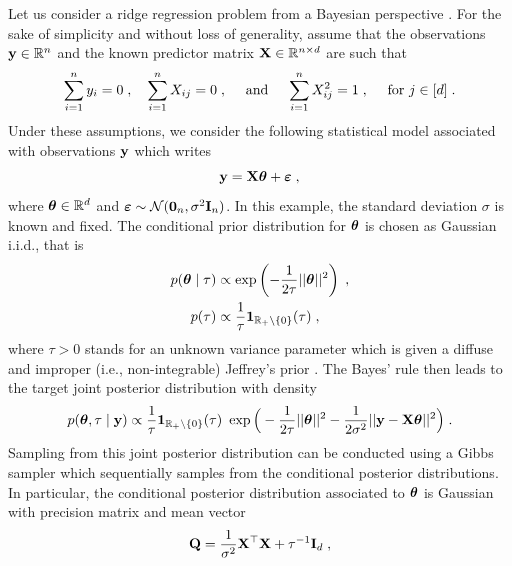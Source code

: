 \documentclass[nohypdvips,onefignum,onetabnum]{siamart171218}
\begin{document}
\begin{example}\label{ex:bayesian_ridge}
  Let us consider a ridge regression problem from a Bayesian perspective \cite{Bishop2006}.
  For the sake of simplicity and without loss of generality, assume that the observations $\mathbf{y} \in \mathbb{R}^n$ and the known predictor matrix $\mathbf{X} \in \mathbb{R}^{n \times d}$ are such that 
  \begin{align}
  \sum_{i=1}^ny_i = 0\;, \quad \sum_{i=1}^nX_{ij} = 0\;, \quad \text{ and } \quad \sum_{i=1}^nX_{ij}^2 = 1\;, \quad \text{ for $j \in [d]$}\;.
  \end{align}
  Under these assumptions, we consider the following statistical model associated with observations $\mathbf{y}$ which writes
  \begin{equation}
    \mathbf{y} = \mathbf{X}\boldsymbol{\theta} + \boldsymbol{\varepsilon}\;,
  \end{equation} 
  where $\boldsymbol{\theta} \in \mathbb{R}^{d}$ and $\boldsymbol{\varepsilon} \sim \mathcal{N}(\mathbf{0}_n,\sigma^2\mathbf{I}_n)$.
 In this example, the standard deviation $\sigma$ is known and fixed.
  The conditional prior distribution for $\boldsymbol{\theta}$ is chosen as Gaussian i.i.d., that is  
    \begin{align}
    p(\boldsymbol{\theta}\mid\tau) &\propto \exp\left(-\frac{1}{2\tau}||\boldsymbol{\theta}||^2\right)\;, \\ 
    p(\tau) &\propto \dfrac{1}{\tau}\boldsymbol{1}_{\mathbb{R}_+\setminus\{0\}}(\tau)\;, 
  \end{align}
  where $\tau > 0$ stands for an unknown variance parameter which is given a diffuse and improper (i.e., non-integrable) Jeffrey's prior \cite{Jeffreys1946,Robert94}. 
 The Bayes' rule then leads to the target joint posterior distribution with density
  \begin{align}
    p(\Bs{\theta},\tau \mid \B{y}) \propto \dfrac{1}{\tau}\Bs{1}_{\mathbb{R}_+\setminus\{0\}}(\tau) \ \exp\Big(-\frac{1}{2\tau}||\Bs{\theta}||^2 - \frac{1}{2\sigma^2}||\B{y}-\B{X}\Bs{\theta}||^2\Big)\eqsp. \label{eq:example_Lasso_posterior}
  \end{align}
Sampling from this joint posterior distribution can be conducted using a Gibbs sampler \cite{Geman1984,Robert2004} which sequentially samples from the conditional posterior distributions.
In particular, the conditional posterior distribution associated to $\boldsymbol{\theta}$ is Gaussian with precision matrix and mean vector
  \begin{align}
    &\B{Q} = \frac{1}{\sigma^{2}}\B{X}^{\top}\B{X} + \tau^{-1}\B{I}_d\eqsp, \\

\end{align}
\end{example}
\end{document}
